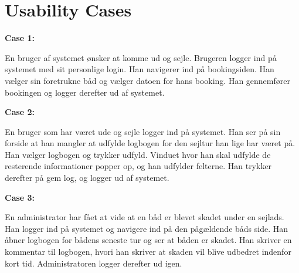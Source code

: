 \chapter{Usability Cases}\label{Usability_cases}
\cbstart
\textbf{Case 1:}

En bruger af systemet ønsker at komme ud og sejle. Brugeren logger ind på systemet med sit personlige login. Han navigerer ind på bookingsiden. Han vælger sin foretrukne båd og vælger datoen for hans booking. Han gennemfører bookingen og logger derefter ud af systemet.

\textbf{Case 2:}

En bruger som har været ude og sejle logger ind på systemet. Han ser på sin forside at han mangler at udfylde logbogen for den sejltur han lige har været på. Han vælger logbogen og trykker udfyld. Vinduet hvor han skal udfylde de resterende informationer popper op, og han udfylder felterne. Han trykker derefter på gem log, og logger ud af systemet.

\textbf{Case 3:}

En administrator har fået at vide at en båd er blevet skadet under en sejlads. Han logger ind på systemet og navigere ind på den pågældende båds side. Han åbner logbogen for bådens seneste tur og ser at båden er skadet. Han skriver en kommentar til logbogen, hvori han skriver at skaden vil blive udbedret indenfor kort tid. Administratoren logger derefter ud igen.

\cbend